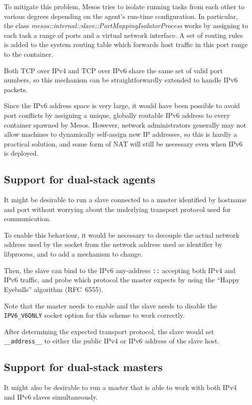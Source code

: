 \documentclass{scrreprt}
\begin{document}
To mitigate this problem, Mesos tries to isolate running tasks from
each other to various degrees depending on the agent's run-time configuration.
In particular, the class \emph{mesos::internal::slave::PortMappingIsolatorProcess}
works by assigning to each task a range of ports and a virtual network interface.
A set of routing rules is added to the system routing table which forwards host
traffic in this port range to the container.

Both TCP over IPv4 and TCP over IPv6 share the same set of valid port numbers, so
this mechanism can be straightforwardly extended to handle IPv6 packets.

Since the IPv6 address space is very large, it would have been possible to
avoid port conflicts by assigning a unique, globally routable IPv6 address
to every container spawned by Mesos.
However, network administrators generally may not allow machines
to dynamically self-assign new IP addresses, so this is hardly a practical
solution, and some form of NAT will still be necessary even when IPv6 is deployed.



\subsection{Support for dual-stack agents}
\label{dual_stack_agents}
It might be desirable to run a slave connected to a master identified by hostname
and port without worrying about the underlying transport protocol used for
communication.

To enable this behaviour, it would be necessary to decouple the actual
network address used by the socket from the network address used as identifier
by libprocess, and to add a mechanism to change.

Then, the slave can bind to the IPv6 any-address \texttt{::} accepting both
IPv4 and IPv6 traffic, and probe which protocol the master expects by using the
``Happy Eyeballs'' algorithm (RFC~6555).

Note that the master needs to enable and the slave needs to disable
the \texttt{IPV6\_V6ONLY} socket option for this scheme to work correctly.

After determining the expected transport protocol, the slave would
set \texttt{\_\_address\_\_} to either the public IPv4 or IPv6 address
of the slave host.



\subsection{Support for dual-stack masters}
It might also be desirable to run a master that is able to work with
both IPv4 and IPv6 slaves simultaneously.
\end{document}
